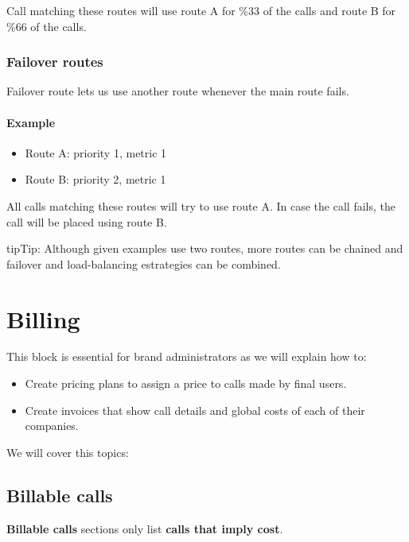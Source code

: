 \documentclass[letterpaper,10pt,english]{sphinxmanual}
\begin{document}
Call matching these routes will use route A for \%33 of the calls and route B for
\%66 of the calls.


\subsubsection{Failover routes}
\label{brand/routing/outgoing_routing:failover-routes}
Failover route lets us use another route whenever the main route fails.
\paragraph{Example}
\begin{itemize}
\item {} 
Route A: priority 1, metric 1

\item {} 
Route B: priority 2, metric 1

\end{itemize}

All calls matching these routes will try to use route A. In case the call fails,
the call will be placed using route B.

\begin{notice}{tip}{Tip:}
Although given examples use two routes, more routes can be chained and
failover and load-balancing estrategies can be combined.
\end{notice}


\section{Billing}
\label{brand/billing/index::doc}\label{brand/billing/index:billing}
This block is essential for brand administrators as we will explain how to:
\begin{itemize}
\item {} 
Create pricing plans to assign a price to calls made by final users.

\item {} 
Create invoices that show call details and global costs of each of their companies.

\end{itemize}

We will cover this topics:


\subsection{Billable calls}
\label{brand/billing/billable_calls::doc}\label{brand/billing/billable_calls:billable-calls}\label{brand/billing/billable_calls:id1}
\textbf{Billable calls} sections only list \textbf{calls that imply cost}.
\end{document}
